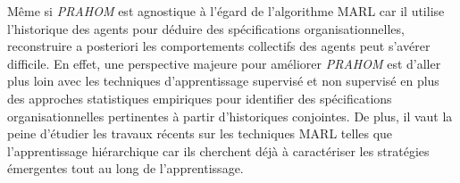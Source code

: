 \documentclass[contribution]{jfsma}
\begin{document}
Même si \emph{PRAHOM} est agnostique à l'égard de l'algorithme MARL car il utilise l'historique des agents pour déduire des spécifications organisationnelles, reconstruire a posteriori les comportements collectifs des agents peut s'avérer difficile. En effet, une perspective majeure pour améliorer \emph{PRAHOM} est d'aller plus loin avec les techniques d'apprentissage supervisé et non supervisé en plus des approches statistiques empiriques pour identifier des spécifications organisationnelles pertinentes à partir d'historiques conjointes. De plus, il vaut la peine d’étudier les travaux récents sur les techniques MARL telles que l’apprentissage hiérarchique car ils cherchent déjà à caractériser les stratégies émergentes tout au long de l’apprentissage.






\end{document}
